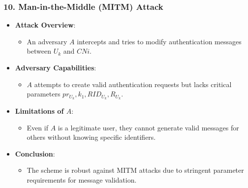 \documentclass[9pt,handout]{beamer}
\begin{document}
\begin{frame}
    \frametitle{10. Man-in-the-Middle (MITM) Attack}
    \begin{itemize}
        \item \textbf{Attack Overview}:
            \begin{itemize}
                \item An adversary \( A \) intercepts and tries to modify authentication messages between \( U_k \) and \( CNi \).
            \end{itemize}
        \item \textbf{Adversary Capabilities}:
            \begin{itemize}
                \item \( A \) attempts to create valid authentication requests but lacks critical parameters \( pr_{U_k}, k_1, RID_{U_k}, R_{U_k} \).
            \end{itemize}
        \item \textbf{Limitations of \( A \)}:
            \begin{itemize}
                \item Even if \( A \) is a legitimate user, they cannot generate valid messages for others without knowing specific identifiers.
            \end{itemize}
        \item \textbf{Conclusion}:
            \begin{itemize}
                \item The scheme is robust against MITM attacks due to stringent parameter requirements for message validation.
            \end{itemize}
    \end{itemize}
\end{frame}
\end{document}
